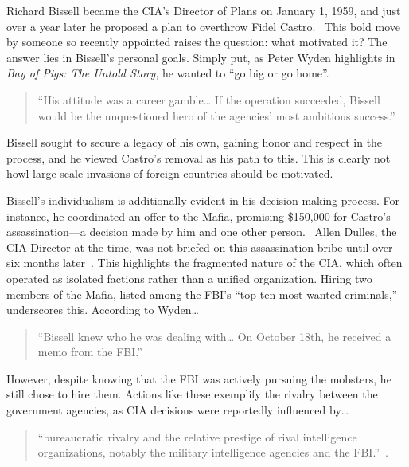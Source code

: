 \documentclass[12pt, twoside]{article}
\begin{document}
    Richard Bissell became the CIA's Director of Plans on January 1, 1959, and just over a year later he proposed a plan to overthrow Fidel Castro.~\parencite{Wyden1979} This bold move by someone so recently appointed raises the question: what motivated it? The answer lies in Bissell's personal goals. Simply put, as Peter Wyden highlights in \textit{Bay of Pigs: The Untold Story}, he wanted to ``go big or go home''.

    \begin{quotation}
        “His attitude was a career gamble… If the operation succeeded, Bissell would be the unquestioned hero of the agencies' most ambitious success.” \parencite{Wyden1979}
    \end{quotation} 

    Bissell sought to secure a legacy of his own, gaining honor and respect in the process, and he viewed Castro's removal as his path to this. This is clearly not howl large scale invasions of foreign countries should be motivated. 

    Bissell's individualism is additionally evident in his decision-making process. For instance, he coordinated an offer to the Mafia, promising \$150,000 for Castro's assassination—a decision made by him and one other person.~\parencite{Wyden1979} Allen Dulles, the CIA Director at the time, was not briefed on this assassination bribe until over six months later~\parencite{Wyden1979}. This highlights the fragmented nature of the CIA, which often operated as isolated factions rather than a unified organization. Hiring two members of the Mafia, listed among the FBI's “top ten most-wanted criminals,” underscores this. According to Wyden\ldots

    \begin{quotation}
        “Bissell knew who he was dealing with… On October 18th, he received a memo from the FBI.”~\parencite{Wyden1979}
    \end{quotation}  

    However, despite knowing that the FBI was actively pursuing the mobsters, he still chose to hire them. Actions like these exemplify the rivalry between the government agencies, as CIA decisions were reportedly influenced by\ldots

    \begin{quotation} 
        “bureaucratic rivalry and the relative prestige of rival intelligence organizations, notably the military intelligence agencies and the FBI.”~\parencite{JeffreysJones2003}.
    \end{quotation} 
    
\end{document}
